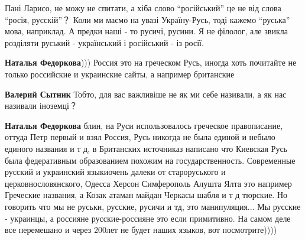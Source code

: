 \begin{itemize}
 

Пані Ларисо, не можу не спитати, а хіба слово \enquote{російський} це не від слова
\enquote{росія, русскій}？ Коли ми маємо на увазі Україну-Русь, тоді кажемо \enquote{руська}
мова, наприклад. А предки наші - то русичі, русини. Я не філолог, але звикла
розділяти руський - український і російський - із росії.

\begin{itemize}
 
\textbf{Наталья Федоркова}))) Россия это на греческом Русь, иногда хоть
почитайте не только российские и украинские сайты, а например британские

\begin{itemize}
 
\textbf{Валерий Сытник} Тобто, для вас важливіше не як ми себе називали, а як нас називали іноземці？

 
\textbf{Наталья Федоркова} блин, на Руси использовалось греческое правописание,
оттуда Петр первый и взял Россия, Русь никогда не была единой и небыло единого
названия и т д, в Британских источниказ написано что Киевская Русь была
федеративным образованием похожим на государственность. Современные русский и
украинский языкиочень далеки от староруського и церковнословянского, Одесса
Херсон Симферополь Алушта Ялта это например Греческие названия, а Козак атаман
майдан Черкасы шабля и т д тюрские. Но говорить что мы не руськи, русские,
русичи и тд, это манипуляция... Мы русские - украинцы, а россияне
русские-россияне это если примитивно. На самом деле все перемешано и через
200лет не будет наших языков, вот посмотрите))))


\end{itemize}
\end{itemize}
\end{itemize}
